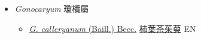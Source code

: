 
  \begin{itemize}
 \item[] \textit{Gonocaryum} 瓊欖屬
                    
  \begin{itemize}
        \item[] \href{http://www.theplantlist.org/tpl1.1/search?q=Gonocaryum+calleryanum}{\textit{G. calleryanum} (Baill.) Becc.}   \href{\detokenize{http://taibnet.sinica.edu.tw/chi/taibnet_species_list.php?T2=柿葉茶茱萸&T2_new_value=true&fr=y}}{柿葉茶茱萸} EN
  \end{itemize}
  \end{itemize}
